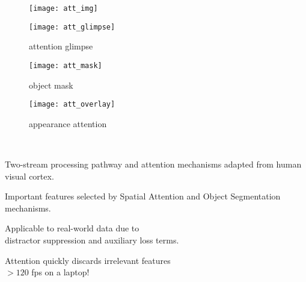 
\vspace{1\baselineskip}


    \begin{minipage}[c]{0.45\textwidth}
        \centering
        \begin{subfigure}[b]{1.\textwidth}
            \texttt{[image: att\_img]}
        \end{subfigure}
        
        \hspace{-30pt}
        \begin{minipage}{.9\textwidth}
            \centering
            \vspace{.5em}
            \begin{subfigure}[b]{.31\textwidth}
                \centering
                \texttt{[image: att\_glimpse]}
                \caption*{\large attention glimpse}
            \end{subfigure}
            \hfill
            \begin{subfigure}[b]{.31\textwidth}
                \centering
                \texttt{[image: att\_mask]}
                \caption*{\large object mask}
            \end{subfigure}
            \hfill
            \begin{subfigure}[b]{.31\textwidth}
                \centering
                \texttt{[image: att\_overlay]}
                \caption*{\large appearance attention}
            \end{subfigure}
            
        \end{minipage}
    \end{minipage}\hfill
\\
    \begin{minipage}[c]{0.45\textwidth}
        \vspace{1\baselineskip}
        \begin{description}[labelsep=1em, leftmargin=!,labelwidth=\widthof{\bfseries Interpretable:}, itemsep=0.5em]
            \item[Bio-inspired:] Two-stream processing pathway and attention mechanisms adapted from human visual cortex.
            \item[Interpretable:] Important features selected by Spatial Attention and Object Segmentation mechanisms.
            \item[Scalable:] Applicable to real-world data due to\\ distractor suppression and auxiliary loss terms.
            \item[Efficient:] Attention quickly discards irrelevant features\\
                              $> 120$ fps on a laptop! 
        \end{description}
    \end{minipage}


